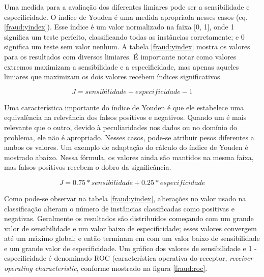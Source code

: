 Uma medida para a avaliação dos diferentes limiares pode ser a sensibilidade e especificidade. O índice de Youden é uma medida apropriada nesses casos (eq. \ref{fraud:yindex}). Esse índice é um valor normalizado na faixa [0, 1], onde 1 significa um teste perfeito, classificando todas as instâncias corretamente; e 0 significa um teste sem valor nenhum. A tabela \ref{fraud:yindex} mostra os valores para os resultados com diversos limiares. É importante notar como valores extremos maximizam a sensibilidade e a especificidade, mas apenas aqueles limiares que maximizam os dois valores recebem índices significativos.

\vspace{2mm}
\begin{equation}
    J = sensibilidade + especificidade - 1
    \label{fraud:yindex}
\end{equation}
\vspace{2mm}

Uma característica importante do índice de Youden é que ele estabelece uma equivalência na relevância dos falsos positivos e negativos. Quando um é mais relevante que o outro, devido à peculiaridades nos dados ou no domínio do problema, ele não é apropriado. Nesses casos, pode-se atribuir pesos diferentes a ambos os valores. Um exemplo de adaptação do cálculo do índice de Youden é mostrado abaixo. Nessa fórmula, os valores ainda são mantidos na mesma faixa, mas falsos positivos recebem o dobro da significância.

\vspace{2mm}
\begin{equation}
    J = 0.75 * sensibilidade + 0.25 * especificidade
\end{equation}
\vspace{2mm}

Como pode-se observar na tabela \ref{fraud:yindex}, alterações no valor usado na classificação alteram o número de instâncias classificadas como positivas e negativas. Geralmente os resultados são distribuídos começando com um grande valor de sensibilidade e um valor baixo de especificidade; esses valores convergem até um máximo global; e então terminam em com um valor baixo de sensibilidade e um grande valor de especificidade. Um gráfico dos valores de sensibilidade e 1 - especificidade é denominado ROC (característica operativa do receptor, \emph{receiver operating characteristic}, conforme mostrado na figura \ref{fraud:roc}.

